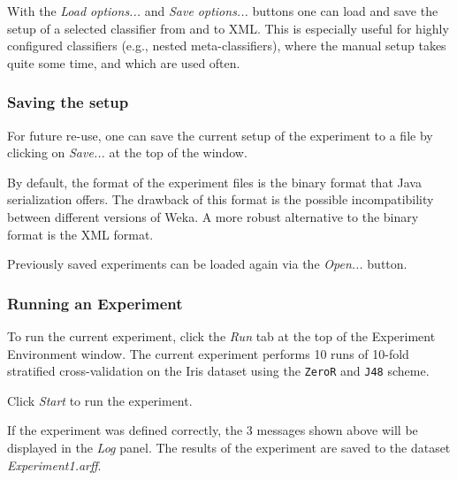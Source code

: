 \documentclass[a4paper]{article}
\begin{document}
With the \textit{Load options...} and \textit{Save options...} buttons one can load and save the setup of a selected classifier from and to XML. This is especially useful for highly configured classifiers (e.g., nested meta-classifiers), where the manual setup takes quite some time, and which are used often.


\subsubsection{Saving the setup}

For future re-use, one can save the current setup of the experiment to a file by clicking on \textit{Save...} at the top of the window.

\begin{center}
\end{center}


By default, the format of the experiment files is the binary format that Java serialization offers. The drawback of this format is the possible incompatibility between different versions of Weka. A more robust alternative to the binary format is the XML format.

Previously saved experiments can be loaded again via the \textit{Open...} button.


\subsubsection{Running an Experiment}

To run the current experiment, click the \textit{Run} tab at the top of the Experiment Environment window. The current experiment performs 10 runs of 10-fold stratified cross-validation on the Iris dataset using the \texttt{ZeroR} and \texttt{J48} scheme.

\begin{center}
\end{center}


Click \textit{Start} to run the experiment.

\begin{center}
\end{center}


If the experiment was defined correctly, the 3 messages shown above will be displayed in the \textit{Log} panel. The results of the experiment are saved to the dataset \textit{Experiment1.arff}. 
\end{document}
